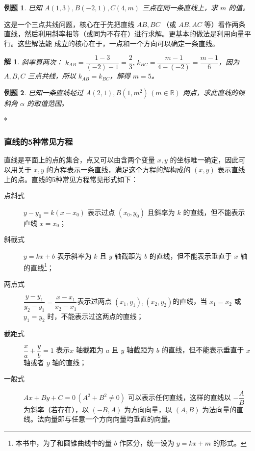 \documentclass[a4paper,openany]{ctexbook}
\newtheorem{example}{例题}[section]
\newtheorem*{solution}{解}
\begin{document}
\begin{example}
    已知 \(A(1,3),B( - 2,1),C(4,m)\) 三点在同一条直线上，求 \(m\) 的值。
\end{example}

这是一个三点共线问题，核心在于先把直线 \(AB,BC\) （或 \(AB,AC\) 等）看作两条直线，然后利用斜率相等（或同为不存在）进行求解。更基本的做法是利用向量平行。这些解法能
成立的核心在于，一点和一个方向可以确定一条直线。

\begin{solution}
    斜率算两次： \(k_{AB} = \dfrac{1 - 3}{( - 2) - 1} =\dfrac{2}{3},\, k_{BC} = \dfrac{m - 1}{4 -( - 2)} = \dfrac{m - 1}{6} \)，因为 \(A,B,C\) 三点共线，所以
    \(k_{AB} = k_{BC}\)，解得 \(m = 5\)。
\end{solution}

\begin{example}\label{AB含参倾斜角}
    已知一条直线经过 \(A(2,1),B(1,m^2)\, (m \in \mathbb{R} )\) 两点，求此直线的倾斜角 \(\alpha\) 的取值范围。
\end{example}

\addproof{例题 \ref{AB含参倾斜角}}{b6ac105e-b896-403e-bea1-f09d55f56e7c}{
    \(\tan \alpha = k_{AB} = \dfrac{m^2 - 1}{1 - 2} = 2 - m^2 \in ( - \infty ,1]\)，则 \(\alpha \in [0,\dfrac{\pi }{4} ]\cup(\dfrac{\pi }{2} ,\pi )\)。
}*

\subsubsection{直线的5种常见方程}

直线是平面上的点的集合，点又可以由含两个变量 \(x,y\) 的坐标唯一确定，因此可以用关于 \(x,y\) 的方程表示一条直线，满足这个方程的解构成的 \((x,y)\) 表示直线上的点。直线的5种常见方程常见形式如下：

\begin{description}
    \item[点斜式] \(y - y_0 = k(x - x_0)\) 表示过点 \((x_0,y_0)\) 且斜率为 \(k\) 的直线，但不能表示直线 \(x = x_0\)；
    \item[斜截式] \(y = kx + b\) 表示斜率为 \(k\) 且 \(y\) 轴截距为 \(b\) 的直线，但不能表示垂直于 \(x\) 轴的直线\footnote{本书中，为了和圆锥曲线中的量 \(b\) 作区分，统一设为 \(y = kx + m\) 的形式。}；
    \item[两点式] \(\dfrac{y - y_1}{y_2 - y_1} = \dfrac{x - x_1}{x_2 - x_1} \)表示过两点 \((x_1,y_1),(x_2,y_2)\)的直线，当 \(x_1 = x_2\) 或 \(y_1 = y_2\) 时，不能表示过这两点的直线；
    \item[截距式] \(\dfrac{x}{a} + \dfrac{y}{b}= 1\) 表示\(x\) 轴截距为 \(a\) 且 \(y\) 轴截距为 \(b\) 的直线，但不能表示垂直于 \(x\) 轴或者 \(y\) 轴的直线；
    \item[一般式] \(Ax + By + C = 0\, (A^2 + B^2\neq 0)\) 可以表示任何直线，这样的直线以 \( - \dfrac{A}{B}\) 为斜率（若存在），以 \(( - B,A)\) 为方向向量，以 \((A,B)\) 为法向量的直线。法向量即与任意一个方向向量均垂直的向量。
\end{description}
\end{document}
